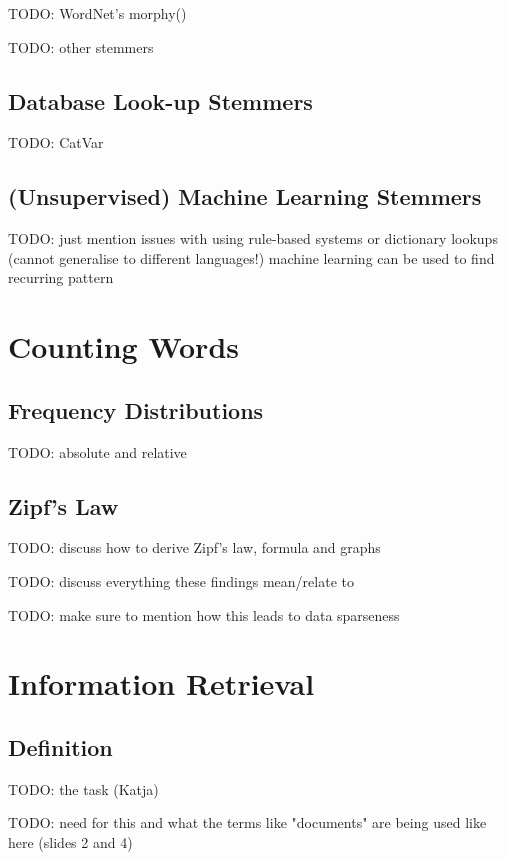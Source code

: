 \documentclass{article}
\begin{document}
TODO: WordNet's morphy()

TODO: other stemmers

\subsection{Database Look-up Stemmers}

TODO: CatVar

\subsection{(Unsupervised) Machine Learning Stemmers}

TODO: just mention issues with using rule-based systems or dictionary lookups (cannot generalise to different languages!) machine learning can be used to find recurring pattern

\section{Counting Words}

\subsection{Frequency Distributions}

TODO: absolute and relative

\subsection{Zipf's Law}

TODO: discuss how to derive Zipf's law, formula and graphs

TODO: discuss everything these findings mean/relate to

TODO: make sure to mention how this leads to data sparseness

\section{Information Retrieval}

\subsection{Definition}

TODO: the task (Katja)

TODO: need for this and what the terms like "documents" are being used like here (slides 2 and 4)
\end{document}
